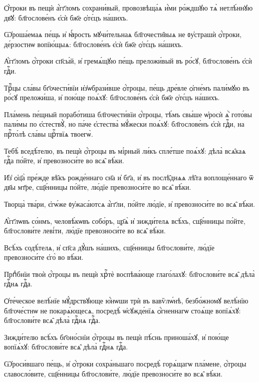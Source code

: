 \hKv Ѻ҆́троки въ пещѝ а҆́гг҃ломъ сохрани́вый, провозвѣща́ѧ  и҆́ми ро́ждшꙋю тѧ̀ нетлѣ́ннꙋю дв҃ꙋ: бл҃гослове́нъ є҆сѝ  бж҃е ѻ҆тє́цъ на́шихъ. 

\hKv Ѡ҆роша́емаѧ пе́щь и҆ ꙗ҆́рость мꙋчи́тельнаѧ бл҃гочести̑выѧ  не ᲂу҆страшѝ ѻ҆́троки, де́рзостнѡ вопїю́щыѧ:  бл҃гослове́нъ є҆сѝ бж҃е ѻ҆тє́цъ на́шихъ. 

\hKv А҆́гг҃ломъ ѻ҆́троки сп҃сы́й, и҆ гремѧ́щꙋю пе́щь преложи́вый  въ ро́сꙋ, бл҃гослове́нъ є҆сѝ гдⷭ҇и. 

\hKv Трⷪ҇цы сла́вы бг҃очести́вїи и҆з̾ѡбрази́вше ѻ҆́троцы, пе́щь  дре́вле ѻ҆гне́мъ пали́мꙋю въ ро́сꙋ преложи́ша, и҆ пою́ще  поѧ́хꙋ: бл҃гослове́нъ є҆сѝ бж҃е ѻ҆тє́цъ на́шихъ.  

\hKv Пла́мень пе́щный порабо́тиша бл҃гочести́вїи ѻ҆́троцы,  тѣ́мъ свы́ше ѡ҆росѝ ѧ҆̀ гото́вы пали́мы по є҆стествꙋ̀, но  па́че є҆стества̀ мꙋ́жески поѧ́хꙋ: бл҃гослове́нъ є҆сѝ  гдⷭ҇и, на прⷭ҇то́лѣ сла́вы црⷭ҇твїѧ твоегѡ̀. 
%

\hKv Тебѣ̀ вседѣ́телю, въ пещѝ ѻ҆́троцы въ мі́рный ли́къ  спле́тше поѧ́хꙋ: дѣла̀ всѧ̑каѧ гдⷭ҇а по́йте, и҆  превозноси́те во всѧ̑ вѣ́ки. 
%

\hKv И҆з̾ ѻ҆ц҃а̀ пре́жде вѣ̑къ рожде́ннаго сн҃а  и҆ бг҃а, и҆ въ послѣ̑днѧѧ лѣ̑та воплоще́ннаго ѿ дв҃ы  мт҃ре, сщ҃е́нницы по́йте, лю́дїе превозноси́те во всѧ̑  вѣ́ки. 
%

\hKv Творца̀ тва́ри, є҆гѡ́же ᲂу҆жаса́ютсѧ а҆́гг҃ли, по́йте  лю́дїе, и҆ превозноси́те во всѧ̑ вѣ́ки. 

\hKv А҆́гг҃лѡвъ со́нмъ, человѣ́кѡвъ собо́ръ, цр҃ѧ̀ и҆ зижди́телѧ  всѣ́хъ, сщ҃е́нницы по́йте,   бл҃гослови́те леві́ти, лю́дїе превозноси́те во всѧ̑ вѣ́ки. 

\hKv Всѣ́хъ содѣ́телѧ, и҆ сп҃са дꙋ́шъ на́шихъ, сщ҃е́нницы  бл҃гослови́те, лю́дїе превозноси́те є҆го̀ во вѣ́ки. 

\hKv Прпⷣбнїи твоѝ ѻ҆́троцы въ пещѝ хрⷭ҇тѐ воспѣва́юще  глаго́лахꙋ: бл҃гослови́те всѧ̑ дѣла̀ гдⷭ҇нѧ гдⷭ҇а. 

\hKv Ѻ҆те́ческое велѣ́нїе мꙋ́дрствꙋюще ю҆́нѡши трѝ въ  вавѷлѡ́нѣ, безбо́жномꙋ велѣ́нїю бл҃гоче́стнѡ не  покарѧ́ющесѧ, посредѣ̀ ѡ҆сꙋжде́нїѧ ѻ҆́гненнагѡ стоѧ́ще  вопїѧ́хꙋ: бл҃гослови́те всѧ̑ дѣла̀ гдⷭ҇нѧ гдⷭ҇а. 

\hKv Зижди́телю всѣ́хъ бг҃оно́снїи ѻ҆́троцы въ пещѝ пѣ́снь  приноша́хꙋ, и҆ пою́ще вопїѧ́хꙋ: бл҃гослови́те всѧ̑ дѣла̀  гдⷭ҇нѧ гдⷭ҇а. 

\hKv Ѡ҆роси́вшаго пе́щь, и҆ ѻ҆́троки сохра́ньшаго посредѣ̀  горѧ́щагѡ пла́мене, ѻ҆́троцы славосло́вите, сщ҃е́нницы  бл҃гослови́те, лю́дїе превозноси́те во всѧ̑ вѣ́ки.  

